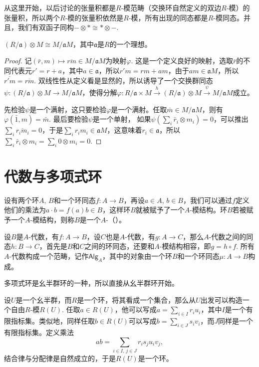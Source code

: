 \para 从这里开始，以后讨论的张量积都是$R$-模范畴（交换环自然定义的双边$R$-模）的张量积，所以两个$R$-模的张量积依然是$R$-模，所有出现的同态都是$R$-模同态。并且，我们有双函子同构$-\otimes *\cong *\otimes -$.

\begin{pro}
$(R/\mathfrak{a})\otimes M\cong M/\mathfrak{a}M$，其中$\mathfrak{a}$是$R$的一个理想。
\end{pro}

\begin{proof}
	记$(\bar{r},m)\mapsto \overline{rm}\in M/\mathfrak{a}M$为映射$\varphi$. 这是一个定义良好的映射，选取$\bar{r}$的不同代表元$r'=r+a$，其中$a\in\mathfrak{a}$，所以$r'm=rm+am$，由于$am\in \mathfrak{a}M$，所以$\overline{r'm}=\overline{rm}$. 双线性性从定义看是显然的，所以诱导了一个交换群同态$\psi:(R/\mathfrak{a})\otimes M\to M/\mathfrak{a}M$，使得分解$\varphi:R/\mathfrak{a}\times M\xrightarrow{h} (R/\mathfrak{a})\otimes M\xrightarrow{\psi} M/\mathfrak{a}M$成立。

	先检验$\psi$是一个满射，这只要检验$\varphi$是一个满射。任取$\bar{m}\in M/\mathfrak{a}M$，则有$\varphi(\bar{1},m)=\bar{m}$. 最后要检验$\psi$是一个单射，
	如果$\psi(\sum_i \bar{r}_i\otimes m_i)=0$，可以推出$\sum_i \overline{r_im_i}=0$，于是$\sum_i r_im_i \in \mathfrak{a}M$，这意味着$r_i\in \mathfrak{a}$，所以$\sum_i \bar{r}_i\otimes m_i=\sum_i 0\otimes m_i=0$.
\end{proof}

\section{代数与多项式环}

设有两个环$A$, $B$和一个环同态$f:A\to B$，再设$a\in A$, $b\in B$，我们可以通过$f$定义他们的乘法为$a\cdot b=f(a)b\in B$，这样环$B$就被赋予了一个$A$-模结构。环$B$若被赋予一个$A$-模结构，则称$B$是一个$A$-（）。

设$B$是$A$-代数，有$f:A\to B$，设$C$也是$A$-代数，有$g:A\to C$，那么$A$-代数之间的同态$h:B\to C$，首先是$B$和$C$之间的环同态，还要和$A$-模结构相容，即$g=h\circ f$. 所有$A$-代数构成一个范畴，记作$\mathsf{Alg}_A$，其中的对象由一个环$B$和一个环同态$\mu:A\to B$构成。

多项式环是幺半群环的一种，所以直接从幺半群环开始。

\para 设$U$是一个幺半群，而$R$是一个环，将其看成一个集合，那么从$U$出发可以构造一个自由$R$-模$R(U)$. 任取$a\in R(U)$，他可以写成$a=\sum_{i\in I} r_i u_i$，其中$I$是一个有限指标集。类似地，同样任取$b\in R(U)$可以写成$b=\sum_{i\in J} s_i v_i$，而$J$同样是一个有限指标集。定义乘法
\[
	ab=\sum_{i\in I,\, j\in J}r_is_j u_i v_j,
\]
结合律与分配律是自然成立的，于是$R(U)$是一个环。

